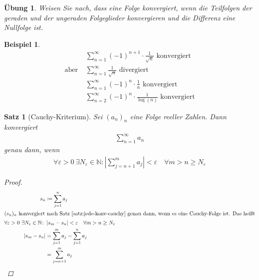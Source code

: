 \documentclass[11pt, twoside, a4paper]{article}
\theoremstyle{plain}
\newtheorem{satz}[blockelement]{Satz}
\newtheorem{uebung}[blockelement]{Übung}
\newtheorem{beispiel}[blockelement]{Beispiel}
\newcommand{\pair}[1]{\left(#1\right)}
\newcommand{\abs}[1]{\left\lvert#1\right\rvert}
\newcommand{\definedas}[0]{\coloneqq}
\newcommand{\N}{\mathbb{N}}
\begin{document}
    \begin{uebung}
        Weisen Sie nach, dass eine Folge konvergiert, wenn die Teilfolgen der geraden und der ungeraden Folgeglieder konvergieren und die Differenz eine Nullfolge ist.
    \end{uebung}

    \begin{beispiel}
        \begin{align*}
            &\sum_{n=1}^{\infty} \pair{-1}^{n+1} \cdot \frac{1}{\sqrt{n}}\text{ konvergiert}\\
            \text{aber } &\sum_{n=1}^{\infty} \frac{1}{\sqrt {n}} \text{ divergiert}\\
            &\sum_{n=1}^{\infty} (-1)^{n} \cdot \frac{1}{n}\text{ konvergiert}\\
            &\sum_{n=2}^{\infty} (-1)^n \cdot \frac{1}{\log\pair{n}}\text{ konvergiert}
        \end{align*}
    \end{beispiel}

    \begin{satz}[Cauchy-Kriterium] %
        \label{satz:cauchy-kriterium}
        Sei $(a_n)_n$ eine Folge reeller Zahlen. Dann konvergiert
        \begin{align*}
            \sum_{n=1}^{\infty} a_n
        \end{align*}
        genau dann, wenn
        \begin{align*}
            \forall \varepsilon > 0~\exists N_{\varepsilon}\in\N\colon \abs{\sum_{j=n+1}^{m} a_j} <\varepsilon\quad\forall m>n\geq N_{\varepsilon}
        \end{align*}
        \begin{proof}
            \begin{align*}
                s_n &\definedas \sum_{j=1}^{n} a_j\\
                \intertext{$(s_n)_n$ konvergiert nach Satz~\ref{satz:jede-konv-cauchy} genau dann, wenn es eine Cauchy-Folge ist. Das heißt}
                \forall\varepsilon > 0~\exists N_{\varepsilon}\in\N\colon &\abs{s_{m} - s_{n}} < \varepsilon\quad\forall m> n \geq N_{\varepsilon}\\
                \abs{s_m - s_n} &= \sum_{j=1}^{m} a_j - \sum_{j=1}^{n} a_j\\
                &= \sum_{j=n+1}^{m} a_j\qedhere
            \end{align*}
        \end{proof}
    \end{satz}
\end{document}
